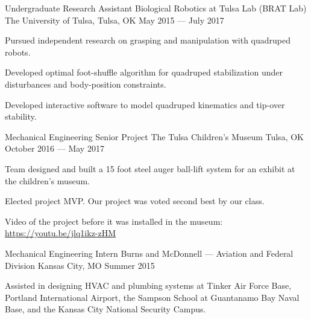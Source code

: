 \begin{cventries}
  \cventry
    {Undergraduate Research Assistant} %
    {Biological Robotics at Tulsa Lab (BRAT Lab)} %
    {The University of Tulsa, Tulsa, OK} %
    {May 2015 --- July 2017} %
    {
      \begin{cvitems} %
        \item {Pursued independent research on grasping and manipulation with quadruped robots.}
        \item {Developed optimal foot-shuffle algorithm for quadruped stabilization under disturbances and body-position constraints.}
        \item {Developed interactive software to model quadruped kinematics and tip-over stability.}
      \end{cvitems}
    }

\cventry
{Mechanical Engineering Senior Project} %
{The Tulsa Children's Museum} %
{Tulsa, OK} %
{October 2016 --- May 2017} %
{
	\begin{cvitems} %
		\item{Team designed and built a 15 foot steel auger ball-lift system for an exhibit at the children's museum.}
		\item{Elected project MVP. Our project was voted second best by our class.}
		\item{Video of the project before it was installed in the museum: \href{https://youtu.be/jlq1ikz-zHM}{\color{awesome} https://youtu.be/jlq1ikz-zHM}}
	\end{cvitems}
}


\cventry
{Mechanical Engineering Intern} %
{Burns and McDonnell --- Aviation and Federal Division} %
{Kansas City, MO} %
{Summer 2015} %
{
	\begin{cvitems} %
		\item{Assisted in designing HVAC and plumbing systems at Tinker Air Force Base, Portland International Airport, the Sampson School at Guantanamo Bay Naval Base, and the Kansas City National Security Campus.}
	\end{cvitems}
}


\end{cventries}
